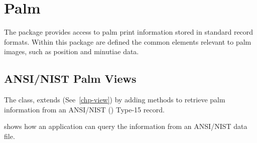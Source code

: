 %
%
\chapter{Palm}
\label{chp-palm}
The  package provides access to palm print information stored in
standard record formats. Within this package are defined the common elements
relevant to palm images, such as position and minutiae data.

\section{ANSI/NIST Palm Views}
\label{sec-an2kpalmview}
The  class, extends
(See~\ref{chp-view}) by adding methods to retrieve palm information from an
ANSI/NIST (\cite{std:an2k11}) Type-15 record.

 shows how an application can query the information from
an ANSI/NIST data file.

